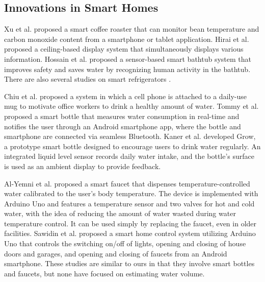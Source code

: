 \documentclass[manuscript,screen,anonymous,review]{acmart}
\begin{document}
\subsection{Innovations in Smart Homes}
Xu et al. \cite{smart_home1} proposed a smart coffee roaster that can monitor bean temperature and carbon monoxide content from a smartphone or tablet application.
Hirai et al. \cite{smart_home2} proposed a ceiling-based display system that simultaneously displays various information.
Hossain et al. \cite{smart_home3} proposed a sensor-based smart bathtub system that improves safety and saves water by recognizing human activity in the bathtub.
There are also several studies on smart refrigerators \cite{smart_refrigerator1, smart_refrigerator2, smart_refrigerator3, smart_refrigerator4}. \par

Chiu et al. \cite{PlayfulBottle} proposed a system in which a cell phone is attached to a daily-use mug to motivate office workers to drink a healthy amount of water.
Tommy et al. \cite{SmartBottle} proposed a smart bottle that measures water consumption in real-time and notifies the user through an Android smartphone app, where the bottle and smartphone are connected via seamless Bluetooth.
Kaner et al. \cite{GROW} developed Grow, a prototype smart bottle designed to encourage users to drink water regularly. An integrated liquid level sensor records daily water intake, and the bottle's surface is used as an ambient display to provide feedback.\par

Al-Yemni et al. \cite{smart_faucet2} proposed a smart faucet that dispenses temperature-controlled water calibrated to the user’s body temperature. The device is implemented with Arduino Uno and features a temperature sensor and two valves for hot and cold water, with the idea of reducing the amount of water wasted during water temperature control. It can be used simply by replacing the faucet, even in older facilities.
Sawidin et al. \cite{smart_faucet3} proposed a smart home control system utilizing Arduino Uno that controls the switching on/off of lights, opening and closing of house doors and garages, and opening and closing of faucets from an Android smartphone.
These studies are similar to ours in that they involve smart bottles and faucets, but none have focused on estimating water volume.


\end{document}
